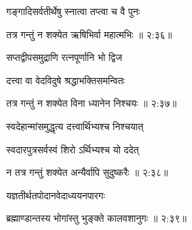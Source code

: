 {\devanagarifont गङ्गादिसर्वतीर्थेषु स्नात्वा तप्त्वा च वै पुनः \thinspace{\dandab} \dontdisplaylinenum }%
 

{\devanagarifont तत्र गन्तुं न शक्येत ऋषिभिर्वा महात्मभिः {॥ २:३६॥} \veg\dontdisplaylinenum }%

{\devanagarifont सप्तद्वीपसमुद्राणि रत्नपूर्णानि भो द्विज \thinspace{\dandab} \dontdisplaylinenum }%

{\devanagarifont दत्त्वा वा वेदविदुषे श्रद्धाभक्तिसमन्वितः  \danda\dontdisplaylinenum }%
 

{\devanagarifont तत्र गन्तुं न शक्येत विना ध्यानेन निश्चयः {॥ २:३७॥} \veg\dontdisplaylinenum }%

{\devanagarifont स्वदेहान्मांसमुद्धृत्य दत्त्वार्थिभ्यश्च निश्चयात् \thinspace{\dandab} \dontdisplaylinenum }%

{\devanagarifont स्वदारपुत्रसर्वस्वं शिरो ऽर्थिभ्यश्च यो ददेत्  \danda\dontdisplaylinenum }%


{\devanagarifont न तत्र गन्तुं शक्येत अन्यैर्वापि सुदुष्करैः {॥ २:३८॥} \veg\dontdisplaylinenum }%

{\devanagarifont यज्ञतीर्थतपोदानवेदाध्ययनपारगः \thinspace{\dandab} \dontdisplaylinenum }%


{\devanagarifont ब्रह्माण्डान्तस्य भोगांस्तु भुङ्क्ते कालवशानुगः {॥ २:३९॥} \veg\dontdisplaylinenum }%

